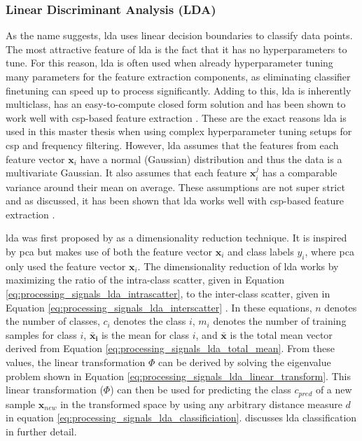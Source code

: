 
\subsubsection{Linear Discriminant Analysis (LDA)}
\label{subsubsec:processing_signals_ml_and_dl_ml_classifiers_lda}

As the name suggests, \gls{lda} uses linear decision boundaries to classify data points.
The most attractive feature of \gls{lda} is the fact that it has no hyperparameters to tune.
For this reason, \gls{lda} is often used when already hyperparameter tuning many parameters for the feature extraction components, as eliminating classifier finetuning can speed up to process significantly.
Adding to this, \gls{lda} is inherently multiclass, has an easy-to-compute closed form solution and has been shown to work well with \gls{csp}-based feature extraction \citep{csp_lda1, csp_lda2}.
These are the exact reasons \gls{lda} is used in this master thesis when using complex hyperparameter tuning setups for \gls{csp} and frequency filtering.
However, \gls{lda} assumes that the features from each feature vector $\textbf{x}_i$ have a normal (Gaussian) distribution and thus the data is a multivariate Gaussian.
It also assumes that each feature $\textbf{x}^j_i$ has a comparable variance around their mean on average.
These assumptions are not super strict and as discussed, it has been shown that \gls{lda} works well with \gls{csp}-based feature extraction \citep{csp_lda1, csp_lda2}.

\Gls{lda} was first proposed by \citet{lda_invention} as a dimensionality reduction technique.
It is inspired by \gls{pca} but makes use of both the feature vector $\textbf{x}_i$ and class labels $y_i$, where \gls{pca} only used the feature vector $\textbf{x}_i$.
The dimensionality reduction of \gls{lda} works by maximizing the ratio of the intra-class scatter, given in Equation \ref{eq:processing_signals_lda_intrascatter}, to the inter-class scatter, given in Equation \ref{eq:processing_signals_lda_interscatter} \citep{lda_classification}.
In these equations, $n$ denotes the number of classes, $c_i$ denotes the class $i$, $m_i$ denotes the number of training samples for class $i$, $\mathbf{\bar{x}_i}$ is the mean for class $i$, and $\mathbf{\bar{x}}$ is the total mean vector derived from Equation \ref{eq:processing_signals_lda_total_mean}.
From these values, the linear transformation $\Phi$ can be derived by solving the eigenvalue problem shown in Equation \ref{eq:processing_signals_lda_linear_transform}.
This linear transformation ($\Phi$) can then be used for predicting the class $c_{pred}$ of a new sample $\mathbf{x}_{new}$ in the transformed space by using any arbitrary distance measure $d$ in equation \ref{eq:processing_signals_lda_classificiation}.
 discusses \gls{lda} classification in further detail.

